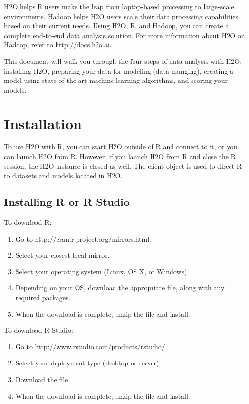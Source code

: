 H2O helps R users make the leap from laptop-based processing to large-scale environments. Hadoop helps H2O users scale their data processing capabilities based on their current needs. Using H2O, R, and Hadoop, you can create a complete end-to-end data analysis solution. For more information about H2O on Hadoop, refer to {\url{http://docs.h2o.ai}}.

This document will walk you through the four steps of data analysis with H2O: installing H2O, preparing your data for modeling (data munging), creating a model using state-of-the-art machine learning algorithms, and scoring your models. 

\section{Installation}

To use H2O with R, you can start H2O outside of R and connect to it, or you can launch H2O from R. However, if you launch H2O from R and close the R session, the H2O instance is closed as well. The client object is used to direct R to datasets and models located in H2O.

\subsection{Installing R or R Studio}

To download R:
\begin{enumerate}
\item Go to \url{http://cran.r-project.org/mirrors.html}. 
\item Select your closest local mirror. 
\item Select your operating system (Linux, OS X, or Windows). 
\item Depending on your OS, download the appropriate file, along with any required packages. 
\item When the download is complete, unzip the file and install. \\
\end{enumerate}

To download R Studio: 

\begin{enumerate}
\item Go to \url{http://www.rstudio.com/products/rstudio/}. 
\item Select your deployment type (desktop or server). 
\item Download the file. 
\item When the download is complete, unzip the file and install.
\end{enumerate}


